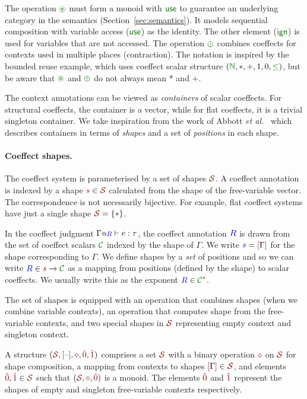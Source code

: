 \noindent
The operation $\cseq$ must form a monoid with $\cunit$ to guarantee an underlying 
category in the semantics (Section~\ref{sec:semantics}). 
It models sequential composition with variable access
($\cunit$) as the identity. The other element ($\czero$) is used for
variables that are not accessed. The operation $\cpar$ combines coeffects
for contexts used in multiple places (contraction). 
The notation is inspired by the bounded reuse example, which uses coeffect scalar structure
$(\cclrd{\mathbb{N}}, \ast, +, 1,0, \cclrd{\leq})$, but be aware that $\cseq$ and $\cpar$ do
not always mean $\ast$ and $+$.

The context annotations can be viewed as \emph{containers} of scalar coeffects.
For structural coeffects, the container is a vector, while for flat coeffects, it is
a trivial singleton container. We take inspiration from the work of Abbott \emph{et al.}~\cite{abbott2005containers}
which describes containers in terms of \emph{shapes} and a set of \emph{positions} in each shape.

\paragraph{Coeffect shapes.}
The coeffect system is parameterised by a set of shapes $\SH$. A coeffect annotation 
is indexed by a shape $\sclrd{s} \in \SH$ calculated from the shape of the free-variable vector. The correspondence is not necessarily 
bijective. For example, flat coeffect systems have just a single shape $\SH = \{ \ast \}$.

In the coeffect judgment $\coctx{\Gamma}{\aclrd{R}} \vdash e : \tau$, the coeffect annotation
$\aclrd{R}$ is drawn from the set of coeffect scalars $\C$ indexed by the shape of $\Gamma$.
We write $\aclrd{s} = \mksh{\Gamma}$ for the shape corresponding to $\Gamma$. We define shapes by a 
\emph{set} of positions and so we can write $\aclrd{R} \in \sclrd{s} \rightarrow \C$ as a
mapping from positions (defined by the shape) to scalar coeffects. We usually write this as 
the exponent $\aclrd{R} \in \C^{\sclrd{s}}$.

The set of shapes is equipped with an operation that combines shapes (when we combine 
variable contexts), an operation that computes shape from the free-variable contexts, 
and two special shapes in $\SH$ representing empty context and singleton context. 

\begin{definition}
  A \emph{} structure $(\SH, \mksh{\textnormal{--}}, \stimes,
  \sempty, \sunit)$ comprises a set $\SH$ with a binary operation
  $\stimes$ on $\SH$ for shape composition, a mapping from contexts to
  shapes $\mksh{\Gamma} \in \SH$, and elements $\sempty,\sunit \in
  \SH$ such that $(\SH, \stimes, \sempty)$ is a monoid. The 
  elements $\sempty$ and $\sunit$ represent the shapes of empty and
  singleton free-variable contexts respectively.
\end{definition}

